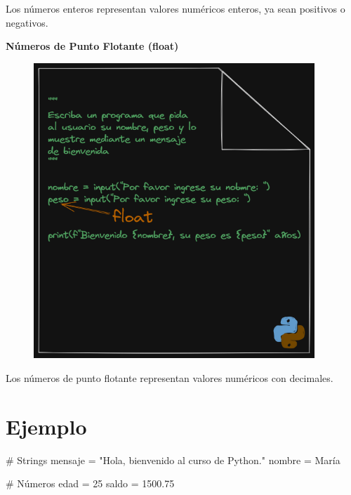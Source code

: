 \documentclass[
  a4paper,
  DIV=11,
  numbers=noendperiod,
  onepage,
  openany]{scrreprt}
\newenvironment{Shaded}{\begin{snugshade}}{\end{snugshade}}
\newcommand{\CommentTok}[1]{\textcolor[rgb]{0.37,0.37,0.37}{#1}}
\newcommand{\DecValTok}[1]{\textcolor[rgb]{0.68,0.00,0.00}{#1}}
\newcommand{\FloatTok}[1]{\textcolor[rgb]{0.68,0.00,0.00}{#1}}
\newcommand{\NormalTok}[1]{\textcolor[rgb]{0.00,0.23,0.31}{#1}}
\newcommand{\OperatorTok}[1]{\textcolor[rgb]{0.37,0.37,0.37}{#1}}
\newcommand{\StringTok}[1]{\textcolor[rgb]{0.13,0.47,0.30}{#1}}
\begin{document}
Los números enteros representan valores numéricos enteros, ya sean
positivos o negativos.

\textbf{Números de Punto Flotante (float)}

\begin{figure}

{\centering \includegraphics[width=4.16667in,height=\textheight]{unidades/unidad3/images/float.png}

}

\end{figure}

Los números de punto flotante representan valores numéricos con
decimales.

\section{Ejemplo}\label{ejemplo-3}

\begin{Shaded}
\begin{Highlighting}[]
\CommentTok{\# Strings}
\NormalTok{mensaje }\OperatorTok{=} \StringTok{"Hola, bienvenido al curso de Python."}
\NormalTok{nombre }\OperatorTok{=} \StringTok{\textquotesingle{}María\textquotesingle{}}

\CommentTok{\# Números}
\NormalTok{edad }\OperatorTok{=} \DecValTok{25}
\NormalTok{saldo }\OperatorTok{=} \FloatTok{1500.75}
\end{Highlighting}
\end{Shaded}
\end{document}
